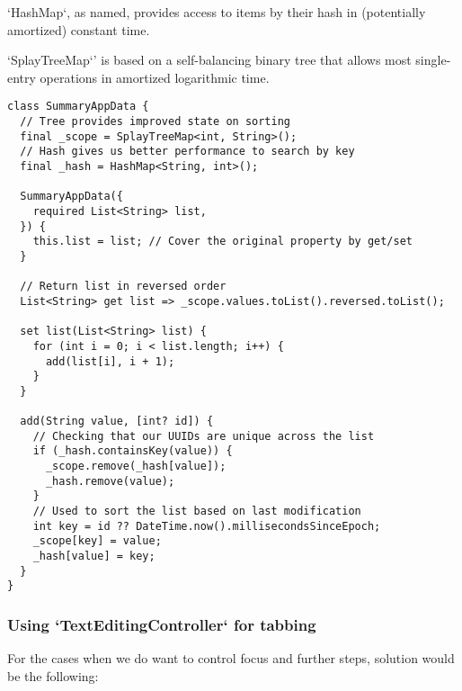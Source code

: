 `HashMap`, as named, provides access to items by their hash in (potentially amortized) constant time.

`SplayTreeMap`' is based on a self-balancing binary tree that allows most single-entry operations in amortized 
logarithmic time.

\begin{lstlisting}
class SummaryAppData {
  // Tree provides improved state on sorting
  final _scope = SplayTreeMap<int, String>();
  // Hash gives us better performance to search by key
  final _hash = HashMap<String, int>();

  SummaryAppData({
    required List<String> list,
  }) {
    this.list = list; // Cover the original property by get/set
  }

  // Return list in reversed order
  List<String> get list => _scope.values.toList().reversed.toList();

  set list(List<String> list) {
    for (int i = 0; i < list.length; i++) {
      add(list[i], i + 1);
    }
  }

  add(String value, [int? id]) {
    // Checking that our UUIDs are unique across the list
    if (_hash.containsKey(value)) {
      _scope.remove(_hash[value]);
      _hash.remove(value);
    }
    // Used to sort the list based on last modification 
    int key = id ?? DateTime.now().millisecondsSinceEpoch;
    _scope[key] = value;
    _hash[value] = key;
  }
}
\end{lstlisting}


\subsubsection{Using `TextEditingController` for tabbing}

For the cases when we do want to control focus and further steps, solution would be the following:

